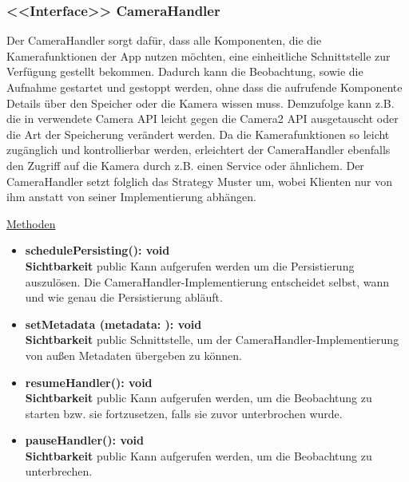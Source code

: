 \subsubsection{<<Interface>> CameraHandler} \label{app:klasse:CameraHandler}
Der CameraHandler sorgt dafür, dass alle Komponenten, die die Kamerafunktionen der App nutzen möchten, eine einheitliche Schnittstelle zur Verfügung gestellt bekommen. Dadurch kann die Beobachtung, sowie die Aufnahme gestartet und gestoppt werden, ohne dass die aufrufende Komponente Details über den Speicher oder die Kamera wissen muss. Demzufolge kann z.B. die in  verwendete Camera API leicht gegen die Camera2 API ausgetauscht oder die Art der Speicherung verändert werden. Da die Kamerafunktionen so leicht zugänglich und kontrollierbar werden, erleichtert der CameraHandler ebenfalls den Zugriff auf die Kamera durch z.B. einen Service oder ähnlichem. Der CameraHandler setzt folglich das Strategy Muster um, wobei Klienten nur von ihm anstatt von seiner Implementierung abhängen.
\newline

\underline{Methoden}
\begin{itemize}
\itemsep0pt

\item \textbf{schedulePersisting(): void}\hfill\\
\textbf{Sichtbarkeit} public\newline
Kann aufgerufen werden um die Persistierung auszulösen. Die CameraHandler-Implementierung entscheidet selbst, wann und wie genau die Persistierung abläuft.

\item \textbf{setMetadata (metadata: ): void}\hfill\\
\textbf{Sichtbarkeit} public\newline
Schnittstelle, um der CameraHandler-Implementierung von außen Metadaten übergeben zu können.

\item \textbf{resumeHandler(): void}\hfill\\
\textbf{Sichtbarkeit} public\newline
Kann aufgerufen werden, um die Beobachtung zu starten bzw. sie fortzusetzen, falls sie zuvor unterbrochen wurde.

\item \textbf{pauseHandler(): void}\hfill\\
\textbf{Sichtbarkeit} public\newline
Kann aufgerufen werden, um die Beobachtung zu unterbrechen.

\end{itemize}